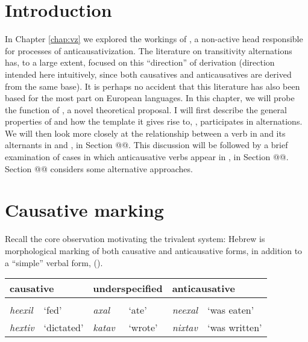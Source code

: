 \label{chap:vd}
\section{Introduction}
In Chapter \ref{chap:vz} we explored the workings of {\vz}, a non-active head responsible for processes of anticausativization. The literature on transitivity alternations has, to a large extent, focused on this ``direction'' of derivation (direction intended here intuitively, since both causatives and anticausatives are derived from the same base). It is perhaps no accident that this literature has also been based for the most part on European languages. In this chapter, we will probe the function of {\vd}, a novel theoretical proposal. I will first describe the general properties of {\vd} and how the template it gives rise to, {\thif}, participates in alternations. We will then look more closely at the relationship between a verb in {\tkal} and its alternants in {\tnif} and {\thif}, in Section @@. This discussion will be followed by a brief examination of cases in which anticausative verbs appear in {\thif}, in Section @@. Section @@ considers some alternative approaches.

\section{Causative marking} \label{vd:caus}
Recall the core observation motivating the trivalent system: Hebrew is morphological marking of both causative and anticausative forms, in addition to a ``simple'' verbal form, (\nextx).
\ex\label{vd:ex:alternations-heb}
	\begin{tabular}{ll|ll|ll}
	\multicolumn{2}{P{4.2cm}|}{causative} &	\multicolumn{2}{P{4cm}|}{underspecified}	& \multicolumn{2}{P{4.2cm}}{anticausative}\\\hline
	\multicolumn{2}{c|}{\thif}	&	\multicolumn{2}{c|}{\tkal}	& \multicolumn{2}{c}{\tnif}\\
	\emph{heexil}	& `fed' &	\emph{axal}	& `ate'	&	\emph{neexal}	& `was eaten' \\
	\emph{hextiv}	& `dictated' &	\emph{katav}	& `wrote'	&	\emph{nixtav}	& `was written' \\
	\end{tabular}
\xe

